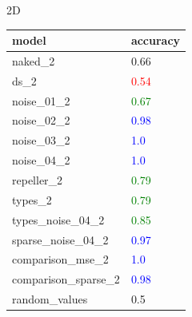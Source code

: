 \documentclass[compress]{beamer}
\begin{document}
	\begin{frame}{2D}
		\begin{table}[!htb]
			\centering
			\begin{tabularx}{\textwidth}{p{5cm} X}
				\hline
				model & accuracy \\ 
				\hline
				naked\_2 & 0.66 \\
				ds\_2 & \textcolor{red}{0.54} \\
				noise\_01\_2 & \textcolor{green}{0.67} \\
				noise\_02\_2 & \textcolor{blue}{0.98} \\
				noise\_03\_2 & \textcolor{blue}{1.0} \\
				noise\_04\_2 & \textcolor{blue}{1.0} \\
				repeller\_2 & \textcolor{green}{0.79} \\
				types\_2 & \textcolor{green}{0.79} \\
				types\_noise\_04\_2 & \textcolor{green}{0.85} \\
				sparse\_noise\_04\_2 & \textcolor{blue}{0.97} \\
				comparison\_mse\_2 & \textcolor{blue}{1.0} \\
				comparison\_sparse\_2 & \textcolor{blue}{0.98} \\
				random\_values & 0.5 \\
				\hline
				\end{tabularx}
			\label{table:comparison_all}
		\end{table}
	\end{frame}
\end{document}
